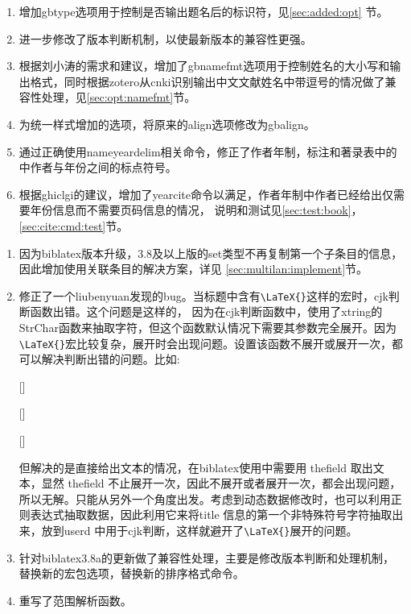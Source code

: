 
\label{up:180120}
\begin{enumerate}
\item 增加gbtype选项用于控制是否输出题名后的标识符，见\ref{sec:added:opt} 节。
\item 进一步修改了版本判断机制，以使最新版本的兼容性更强。
\item 根据刘小涛的需求和建议，增加了gbnamefmt选项用于控制姓名的大小写和输出格式，同时根据zotero从cnki识别输出中文文献姓名中带逗号的情况做了兼容性处理，见\ref{sec:opt:namefmt}节。
\item 为统一样式增加的选项，将原来的align选项修改为gbalign。
\item 通过正确使用nameyeardelim相关命令，修正了作者年制，标注和著录表中的中作者与年份之间的标点符号。
\item 根据ghiclgi的建议，增加了yearcite命令以满足，作者年制中作者已经给出仅需要年份信息而不需要页码信息的情况，
    说明和测试见\ref{sec:test:book}，\ref{sec:cite:cmd:test}节。
\end{enumerate}

\label{up:171121}
\begin{enumerate}
\item 因为biblatex版本升级，3.8及以上版的set类型不再复制第一个子条目的信息，因此增加使用关联条目的解决方案，详见
\ref{sec:multilan:implement}节。

\item 修正了一个liubenyuan发现的bug。当标题中含有\verb|\LaTeX{}|这样的宏时，cjk判断函数出错。这个问题是这样的，
    因为在cjk判断函数中，使用了xtring的StrChar函数来抽取字符，但这个函数默认情况下需要其参数完全展开。因为\verb|\LaTeX{}|宏比较复杂，展开时会出现问题。设置该函数不展开或展开一次，都可以解决判断出错的问题。比如:
    \begin{texlist}
    \expandarg
    [\tempa]%
    \tempa

    [\tempa]%
    \tempa

    [\tempa]%
    \tempa
    \end{texlist}
    但解决的是直接给出文本的情况，在biblatex使用中需要用 thefield 取出文本，显然 thefield 不止展开一次，因此不展开或者展开一次，都会出现问题，所以无解。只能从另外一个角度出发。考虑到动态数据修改时，也可以利用正则表达式抽取数据，因此利用它来将title 信息的第一个非特殊符号字符抽取出来，放到userd 中用于cjk判断，这样就避开了\verb|\LaTeX{}|展开的问题。
    
\item 针对biblatex3.8a的更新做了兼容性处理，主要是修改版本判断和处理机制，替换新的宏包选项，替换新的排序格式命令。

\item 重写了范围解析函数。

\end{enumerate}


